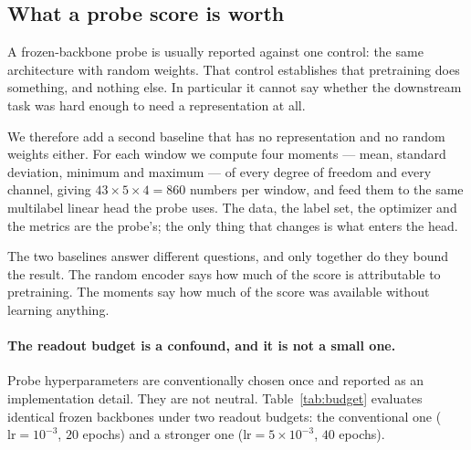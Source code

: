 
\subsection{What a probe score is worth}
\label{sec:baselines}

A frozen-backbone probe is usually reported against one control: the same architecture
with random weights. That control establishes that pretraining does something, and
nothing else. In particular it cannot say whether the downstream task was hard enough to
need a representation at all.

We therefore add a second baseline that has no representation and no random weights
either. For each window we compute four moments --- mean, standard deviation, minimum
and maximum --- of every degree of freedom and every channel, giving
$43 \times 5 \times 4 = 860$ numbers per window, and feed them to the same multilabel
linear head the probe uses. The data, the label set, the optimizer and the metrics are
the probe's; the only thing that changes is what enters the head.

The two baselines answer different questions, and only together do they bound the
result. The random encoder says how much of the score is attributable to pretraining.
The moments say how much of the score was available without learning anything.

\paragraph{The readout budget is a confound, and it is not a small one.}
Probe hyperparameters are conventionally chosen once and reported as an implementation
detail. They are not neutral. Table~\ref{tab:budget} evaluates identical frozen
backbones under two readout budgets: the conventional one ($\text{lr}=10^{-3}$, $20$
epochs) and a stronger one ($\text{lr}=5\times10^{-3}$, $40$ epochs).

